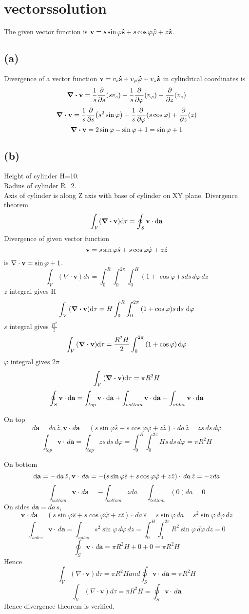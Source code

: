 \section*{vectorssolution}
The given vector function is \(
\vb{v}=s\sin{\varphi}\vu{s}+s\cos{\varphi}\vu{\varphi}+z\vu{z}
\).
\subsection*{(a)}
Divergence of a vector function 
\(\vb{v}=v_s\vu{s}+v_{\varphi}\vu{\varphi}+v_z\vu{z} \) in cylindrical coordinates is \[\div{\vb{v}}=\frac{1}{s}\pdv{s}(sv_s)+\frac{1}{s}\pdv{\varphi}(v_{\varphi})+\pdv{z}(v_z)\]
\[\div{\vb{v}}=\frac{1}{s}\pdv{s}(s^2\sin{\varphi})+\frac{1}{s}\pdv{\varphi}(s\cos{\varphi})+\pdv{z}(z)\]
\[\div{\vb{v}}=2\sin{\varphi}-\sin{\varphi}+1=\sin{\varphi}+1\]
\subsection*{(b)}
Height of cylinder H=10.\\
Radius of cylinder R=2.\\
Axis of cylinder is along Z axis with base of cylinder on XY plane.
Divergence theorem \[\int_{V}(\div{\vb{v}})\dd\tau=\oint_{S}{\vb{v}\cdot\dd{\vb{a}}}\]
Divergence of given vector function \[\vb{v}=s\sin{\varphi}\hat{s}+s\cos{\varphi}\hat{\varphi}+z\hat{z}\] is  \(\nabla\cdot\vb{v}=\sin{\varphi}+1\).
\[\int_{V}{(\nabla\cdot{\mathbf{v}})d\tau}=\int_{0}^{R}\int_{0}^{2\pi}\int_{0}^{H}{(1+\cos{\varphi})sds\,d{\varphi}\,dz}
\]
$z$ integral gives H
\[\int_{V}{(\div{\vb{v}})\dd\tau}=H\int_{0}^{R}\int_{0}^{2\pi}{(1+\cos{\varphi})s\dd{s}\,\dd{\varphi}}
\]
$s$ integral gives \(\frac{R^2}{2}\)
\[\int_{V}{(\div{\vb{v}})\dd\tau}=\frac{R^2H}{2}\int_{0}^{2\pi}{(1+\cos{\varphi})\dd{\varphi}}\]
\(\varphi\) integral gives \(2\pi\)
\[\int_{V}{(\div{\vb{v}})\dd\tau}=\pi{R^2H}\]
\[
\oint_{S}\vb{v}\cdot\dd{\vb{a}}=\int_{top}\vb{v}\cdot\dd\vb{a}+\int_{bottom}{\vb{v}\cdot\dd\vb{a}}+\int_{sides}{\vb{v}\cdot\dd\vb{a}}\]

On top \[d{\mathbf{a}}=da\,\hat{z}, \mathbf{v}\cdot\,d{\mathbf{a}}=(s\sin{\varphi}\hat{s}+s\cos{\varphi}\hat{\varphi}+z\hat{z})\cdot\,da\,\hat{z}=zs\,ds\,d{\varphi}\]
\[\int_{top}{\mathbf{v}\cdot\,d{\mathbf{a}}}=\int_{top}{zs\,ds\,d{\varphi}}=\int_{0}^{R}\int_{0}^{2\pi}{Hs\,ds\,d{\varphi}}=\pi{R^2H}\]

On bottom \[\dd\vb{a}=-\dd{a}\hat{z}, \vb{v}\cdot\,d{\mathbf{a}}=-(s\sin{\varphi}\hat{s}+s\cos{\varphi}\hat{\varphi}+z\hat{z})\cdot\,da\,\hat{z}=-zda\]
\[\int_{bottom}{\mathbf{v}\cdot\,d{\mathbf{a}}}=-\int_{bottom}{zda}=\int_{bottom}{(0)da}=0\]
On sides \(d{\mathbf{a}}=da\,\hat{s}\), \[\mathbf{v}\cdot\,d{\mathbf{a}}=(s\sin{\varphi}\hat{s}+s\cos{\varphi}\hat{\varphi}+z\hat{z})\cdot\,da\,\hat{s}=s\sin{\varphi}\,da=s^2\sin{\varphi}\,d{\varphi}\,dz\]
\[\int_{sides}{\mathbf{v}\cdot\,d{\mathbf{a}}}=\int_{sides}{s^2\sin{\varphi}\,d{\varphi}\,dz}=\int_{0}^{H}\int_{0}^{2\pi}{R^2\sin{\varphi}\,d{\varphi}\,dz}=0\]
\[\oint_{S}{\mathbf{v}\cdot\,d{\mathbf{a}}}=\pi{R^2H}+0+0=\pi{R^2H}\]
Hence \[\int_{V}{(\nabla\cdot{\mathbf{v}})d\tau}=\pi{R^2H} and \oint_{S}{\mathbf{v}\cdot\,d{\mathbf{a}}}=\pi{R^2H}\]
\[\int_{V}{(\nabla\cdot{\mathbf{v}})d\tau}=\pi{R^2H}=\oint_{S}{\mathbf{v}\cdot\,d{\mathbf{a}}}\]
Hence divergence theorem is verified.
